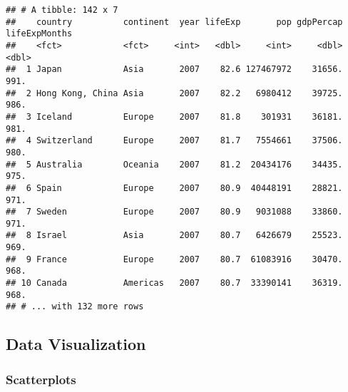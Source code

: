 \documentclass[
]{article}
\newenvironment{Shaded}{\begin{snugshade}}{\end{snugshade}}
\newcommand{\CommentTok}[1]{\textcolor[rgb]{0.56,0.35,0.01}{\textit{#1}}}
\newcommand{\DataTypeTok}[1]{\textcolor[rgb]{0.13,0.29,0.53}{#1}}
\newcommand{\DecValTok}[1]{\textcolor[rgb]{0.00,0.00,0.81}{#1}}
\newcommand{\KeywordTok}[1]{\textcolor[rgb]{0.13,0.29,0.53}{\textbf{#1}}}
\newcommand{\NormalTok}[1]{#1}
\newcommand{\OperatorTok}[1]{\textcolor[rgb]{0.81,0.36,0.00}{\textbf{#1}}}
\newcommand{\StringTok}[1]{\textcolor[rgb]{0.31,0.60,0.02}{#1}}
\begin{document}
\begin{verbatim}
## # A tibble: 142 x 7
##    country          continent  year lifeExp       pop gdpPercap lifeExpMonths
##    <fct>            <fct>     <int>   <dbl>     <int>     <dbl>         <dbl>
##  1 Japan            Asia       2007    82.6 127467972    31656.          991.
##  2 Hong Kong, China Asia       2007    82.2   6980412    39725.          986.
##  3 Iceland          Europe     2007    81.8    301931    36181.          981.
##  4 Switzerland      Europe     2007    81.7   7554661    37506.          980.
##  5 Australia        Oceania    2007    81.2  20434176    34435.          975.
##  6 Spain            Europe     2007    80.9  40448191    28821.          971.
##  7 Sweden           Europe     2007    80.9   9031088    33860.          971.
##  8 Israel           Asia       2007    80.7   6426679    25523.          969.
##  9 France           Europe     2007    80.7  61083916    30470.          968.
## 10 Canada           Americas   2007    80.7  33390141    36319.          968.
## # ... with 132 more rows
\end{verbatim}

\hypertarget{data-visualization}{%
\subsection{Data Visualization}\label{data-visualization}}

\hypertarget{scatterplots}{%
\subsubsection{Scatterplots}\label{scatterplots}}

\begin{Shaded}
\end{Shaded}
\end{document}
